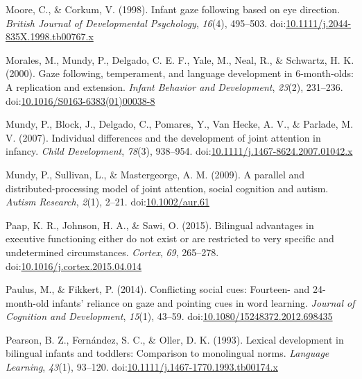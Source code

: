 \documentclass[,man,floatsintext]{apa6}
\begin{document}
\leavevmode\hypertarget{ref-Moore_Corkum_1998}{}%
Moore, C., \& Corkum, V. (1998). Infant gaze following based on eye direction. \emph{British Journal of Developmental Psychology}, \emph{16}(4), 495--503. doi:\href{https://doi.org/10.1111/j.2044-835X.1998.tb00767.x}{10.1111/j.2044-835X.1998.tb00767.x}

\leavevmode\hypertarget{ref-Morales_etal_2000}{}%
Morales, M., Mundy, P., Delgado, C. E. F., Yale, M., Neal, R., \& Schwartz, H. K. (2000). Gaze following, temperament, and language development in 6-month-olds: A replication and extension. \emph{Infant Behavior and Development}, \emph{23}(2), 231--236. doi:\href{https://doi.org/10.1016/S0163-6383(01)00038-8}{10.1016/S0163-6383(01)00038-8}

\leavevmode\hypertarget{ref-Mundy_etal_2007}{}%
Mundy, P., Block, J., Delgado, C., Pomares, Y., Van Hecke, A. V., \& Parlade, M. V. (2007). Individual differences and the development of joint attention in infancy. \emph{Child Development}, \emph{78}(3), 938--954. doi:\href{https://doi.org/10.1111/j.1467-8624.2007.01042.x}{10.1111/j.1467-8624.2007.01042.x}

\leavevmode\hypertarget{ref-Mundy_etal_2009}{}%
Mundy, P., Sullivan, L., \& Mastergeorge, A. M. (2009). A parallel and distributed-processing model of joint attention, social cognition and autism. \emph{Autism Research}, \emph{2}(1), 2--21. doi:\href{https://doi.org/10.1002/aur.61}{10.1002/aur.61}

\leavevmode\hypertarget{ref-Paap_etal_2015}{}%
Paap, K. R., Johnson, H. A., \& Sawi, O. (2015). Bilingual advantages in executive functioning either do not exist or are restricted to very specific and undetermined circumstances. \emph{Cortex}, \emph{69}, 265--278. doi:\href{https://doi.org/10.1016/j.cortex.2015.04.014}{10.1016/j.cortex.2015.04.014}

\leavevmode\hypertarget{ref-Paulus_Fikkert_2014}{}%
Paulus, M., \& Fikkert, P. (2014). Conflicting social cues: Fourteen- and 24-month-old infants' reliance on gaze and pointing cues in word learning. \emph{Journal of Cognition and Development}, \emph{15}(1), 43--59. doi:\href{https://doi.org/10.1080/15248372.2012.698435}{10.1080/15248372.2012.698435}

\leavevmode\hypertarget{ref-Pearson_etal_1993}{}%
Pearson, B. Z., Fernández, S. C., \& Oller, D. K. (1993). Lexical development in bilingual infants and toddlers: Comparison to monolingual norms. \emph{Language Learning}, \emph{43}(1), 93--120. doi:\href{https://doi.org/10.1111/j.1467-1770.1993.tb00174.x}{10.1111/j.1467-1770.1993.tb00174.x}
\end{document}
